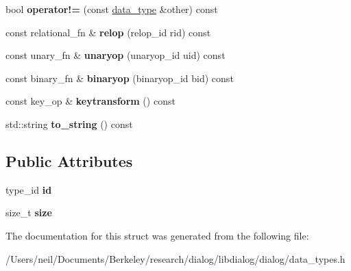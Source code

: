 \begin{DoxyCompactItemize}
bool {\bfseries operator!=} (const \hyperlink{structdialog_1_1data__type}{data\+\_\+type} \&other) const
\item 
\mbox{\label{structdialog_1_1data__type_aba8aaca842503e3b0118825520070988}} 
const relational\+\_\+fn \& {\bfseries relop} (relop\+\_\+id rid) const
\item 
\mbox{\label{structdialog_1_1data__type_aa4307e017509255887d8ddf25358c16c}} 
const unary\+\_\+fn \& {\bfseries unaryop} (unaryop\+\_\+id uid) const
\item 
\mbox{\label{structdialog_1_1data__type_a27657c80d0951a937be61d199fabff7f}} 
const binary\+\_\+fn \& {\bfseries binaryop} (binaryop\+\_\+id bid) const
\item 
\mbox{\label{structdialog_1_1data__type_ac1c63786702a0c2f4fe7367c34f3880a}} 
const key\+\_\+op \& {\bfseries keytransform} () const
\item 
\mbox{\label{structdialog_1_1data__type_a5f32bdf7dd0dbceb45727672810cfd3f}} 
std\+::string {\bfseries to\+\_\+string} () const
\end{DoxyCompactItemize}
\subsection*{Public Attributes}
\begin{DoxyCompactItemize}
\item 
\mbox{\label{structdialog_1_1data__type_afe64e30abff6e7d1488dc8ef5a911df6}} 
type\+\_\+id {\bfseries id}
\item 
\mbox{\label{structdialog_1_1data__type_a9587af728278c26fb62eb25a0988354b}} 
size\+\_\+t {\bfseries size}
\end{DoxyCompactItemize}


The documentation for this struct was generated from the following file\+:\begin{DoxyCompactItemize}
\item 
/\+Users/neil/\+Documents/\+Berkeley/research/dialog/libdialog/dialog/data\+\_\+types.\+h\end{DoxyCompactItemize}
